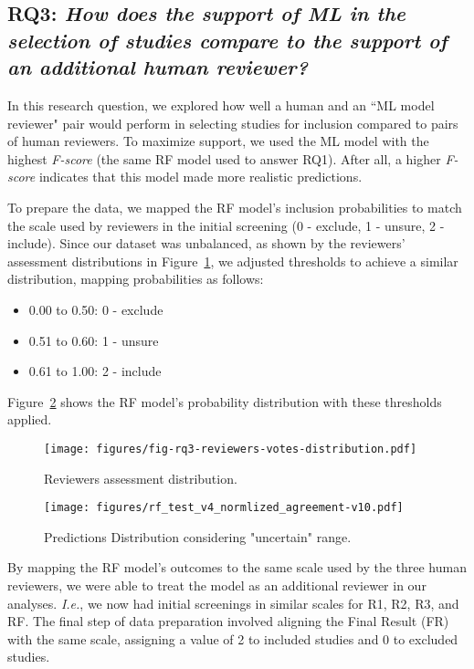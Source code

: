\subsection{RQ3: \textit{How does the support of ML in the selection of studies compare to the support of an additional human reviewer?}}
\label{results:RQ3}

In this research question, we explored how well a human and an ``ML model reviewer" pair would perform in selecting studies for inclusion compared to pairs of human reviewers. To maximize support, we used the ML model with the highest \textit{F-score} (the same RF model used to answer RQ1). After all, a higher \textit{F-score} indicates that this model made more realistic predictions. 

To prepare the data, we mapped the RF model’s inclusion probabilities to match the scale used by reviewers in the initial screening (0 - exclude, 1 - unsure, 2 - include). Since our dataset was unbalanced, as shown by the reviewers' assessment distributions in Figure~\ref{fig:fig-reviewers-votes-distribution}, we adjusted thresholds to achieve a similar distribution, mapping probabilities as follows:
\begin{itemize}
    \item 0.00 to 0.50: 0 - exclude
    \item 0.51 to 0.60: 1 - unsure
    \item 0.61 to 1.00: 2 - include
\end{itemize}

Figure~\ref{fig:fig-rf-normalized-distribution} shows the RF model's probability distribution with these thresholds applied. 

\begin{figure}[ht]
    \centering
    \texttt{[image: figures/fig-rq3-reviewers-votes-distribution.pdf]}
    \caption{Reviewers assessment distribution.}
    \label{fig:fig-reviewers-votes-distribution}
\end{figure}

\begin{figure}[ht]
    \centering
    \texttt{[image: figures/rf\_test\_v4\_normlized\_agreement-v10.pdf]}
    \caption{Predictions Distribution considering "uncertain" range.}
    \label{fig:fig-rf-normalized-distribution}
\end{figure}

By mapping the RF model’s outcomes to the same scale used by the three human reviewers, we were able to treat the model as an additional reviewer in our analyses. \textit{I.e.}, we now had initial screenings in similar scales for R1, R2, R3, and RF. The final step of data preparation involved aligning the Final Result (FR) with the same scale, assigning a value of 2 to included studies and 0 to excluded studies. 

